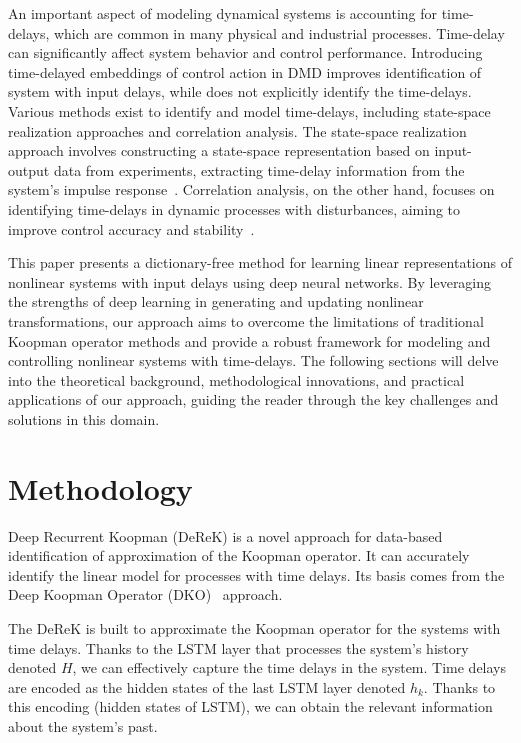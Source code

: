 \documentclass[conference]{IEEEtran}
\begin{document}
An important aspect of modeling dynamical systems is accounting for time-delays, which are common in many physical and industrial processes. Time-delay can significantly affect system behavior and control performance. Introducing time-delayed embeddings of control action in DMD improves identification of system with input delays, while does not explicitly identify the time-delays. Various methods exist to identify and model time-delays, including state-space realization approaches and correlation analysis. The state-space realization approach involves constructing a state-space representation based on input-output data from experiments, extracting time-delay information from the system's impulse response~\cite{Lima2015254}. Correlation analysis, on the other hand, focuses on identifying time-delays in dynamic processes with disturbances, aiming to improve control accuracy and stability~\cite{Li201792}.

This paper presents a dictionary-free method for learning linear representations of nonlinear systems with input delays using deep neural networks. By leveraging the strengths of deep learning in generating and updating nonlinear transformations, our approach aims to overcome the limitations of traditional Koopman operator methods and provide a robust framework for modeling and controlling nonlinear systems with time-delays. The following sections will delve into the theoretical background, methodological innovations, and practical applications of our approach, guiding the reader through the key challenges and solutions in this domain.

\section{Methodology}



Deep Recurrent Koopman (DeReK) is a novel approach for data-based identification of approximation of the Koopman operator. It can accurately identify the linear model for processes with time delays. Its basis comes from the Deep Koopman Operator (DKO)~\cite{lusch2018deep} approach.

The DeReK is built to approximate the Koopman operator for the systems with time delays. Thanks to the LSTM layer that processes the system's history denoted $H$, we can effectively capture the time delays in the system. Time delays are encoded as the hidden states of the last LSTM layer denoted $h_k$. Thanks to this encoding (hidden states of LSTM), we can obtain the relevant information about the system's past. 
\end{document}
